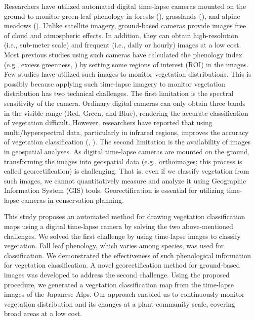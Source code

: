 \documentclass{article}
\begin{document}
Researchers have utilized automated digital time-lapse cameras mounted on the ground to monitor green-leaf phenology in forests (\cite{Richardson2009EcolAppl}), grasslands (\cite{Browning2017RemSen}), and alpine meadows (\cite{IdeOguma2013EcolInfom}). Unlike satellite imagery, ground-based cameras provide images free of cloud and atmospheric effects. In addition, they can obtain high-resolution (i.e., sub-meter scale) and frequent (i.e., daily or hourly) images at a low cost. Most previous studies using such cameras have calculated the phenology index (e.g., excess greenness, \cite{Woebbecke1995ASAE}) by setting some regions of interest (ROI) in the images. Few studies have utilized such images to monitor vegetation distributions. This is possibly because applying such time-lapse imagery to monitor vegetation distribution has two technical challenges. The first limitation is the spectral sensitivity of the camera. Ordinary digital cameras can only obtain three bands in the visible range (Red, Green, and Blue), rendering the accurate classification of vegetation difficult. However, researchers have reported that using multi/hyperspectral data, particularly in infrared regions, improves the accuracy of vegetation classification (\cite{Thenkabail2004RemSenEnv}, \cite{Schmidt2003RemSenEnv}). The second limitation is the availability of images in geospatial analyses. As digital time-lapse cameras are mounted on the ground, transforming the images into geospatial data (e.g., orthoimages; this process is called georectification) is challenging. That is, even if we classify vegetation from such images, we cannot quantitatively measure and analyze it using Geographic Information System (GIS) tools. Georectification is essential for utilizing time-lapse cameras in conservation planning.

This study proposes an automated method for drawing vegetation classification maps using a digital time-lapse camera by solving the two above-mentioned challenges. We solved the first challenge by using time-lapse images to classify vegetation. Fall leaf phenology, which varies among species, was used for classification. We demonstrated the effectiveness of such phenological information for vegetation classification. A novel georectification method for ground-based images was developed to address the second challenge. Using the proposed procedure, we generated a vegetation classification map from the time-lapse images of the Japanese Alps. Our approach enabled us to continuously monitor vegetation distribution and its changes at a plant-community scale, covering broad areas at a low cost.
\end{document}

